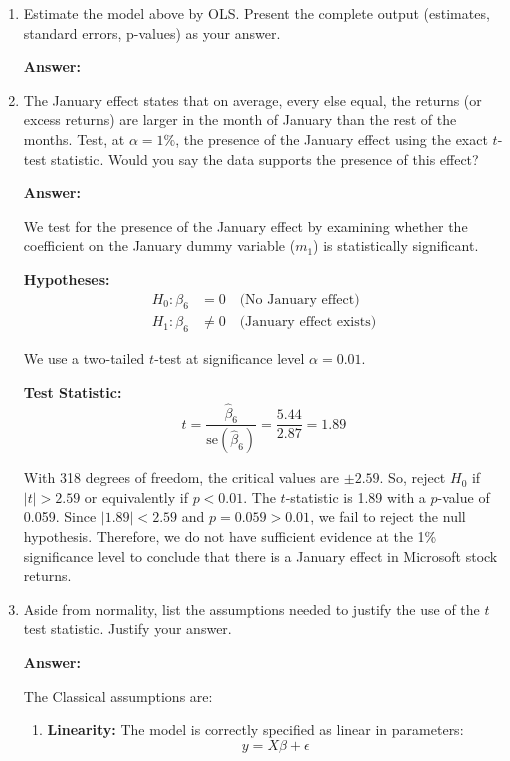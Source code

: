 \documentclass[12pt,a4paper]{article}
\begin{document}
\begin{enumerate}[label=(\alph*)]
  \item Estimate the model above by OLS. Present the complete output (estimates, standard errors, p-values) as your answer.
  
  \textbf{Answer:} 

  
  
  \item The January effect states that on average, every else equal, the returns (or excess returns) are larger in the month of January than the rest of the months. Test, at $\alpha = 1\%$, the presence of the January effect using the exact $t$-test statistic. Would you say the data supports the presence of this effect?
  
  \textbf{Answer:} 

  We test for the presence of the January effect by examining whether the coefficient on the January dummy variable ($m_1$) is statistically significant.

  \textbf{Hypotheses:}
  \begin{align*}
      H_0: \beta_6 &= 0 \quad \text{(No January effect)} \\
      H_1: \beta_6 &\neq 0 \quad \text{(January effect exists)}
  \end{align*}

  We use a two-tailed $t$-test at significance level $\alpha = 0.01$.

    \textbf{Test Statistic:}
      \[
          t = \frac{\hat{\beta}_6}{\text{se}(\hat{\beta}_6)} = \frac{5.44}{2.87} = 1.89
      \]

  With 318 degrees of freedom, the critical values are $\pm 2.59$. So, reject $H_0$ if $|t| > 2.59$ or equivalently if $p < 0.01$.
  The $t$-statistic is 1.89 with a $p$-value of 0.059. Since $|1.89| < 2.59$ and $p = 0.059 > 0.01$, we fail to reject the null hypothesis.
  Therefore, we do not have sufficient evidence at the 1\% significance level to conclude that there is a January effect in Microsoft stock returns.
  
  \item Aside from normality, list the assumptions needed to justify the use of the $t$ test statistic. Justify your answer.
  
  \textbf{Answer:} 

    The Classical assumptions are:

      \begin{enumerate}
      \item \textbf{Linearity:} The model is correctly specified as linear in parameters:
      $$y = X\beta + \epsilon$$


\end{enumerate}
\end{enumerate}
\end{document}
